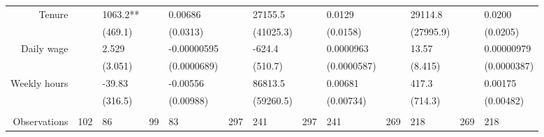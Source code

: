 \begin{tabular}{rrrrrrrrrrrrr}
Tenure & \multicolumn{1}{l}{} & \multicolumn{1}{l}{1063.2**} & \multicolumn{1}{l}{} & \multicolumn{1}{l}{0.00686} & \multicolumn{1}{l}{} & \multicolumn{1}{l}{27155.5} & \multicolumn{1}{l}{} & \multicolumn{1}{l}{0.0129} & \multicolumn{1}{l}{} & \multicolumn{1}{l}{29114.8} & \multicolumn{1}{l}{} & \multicolumn{1}{l}{0.0200} \\
      & \multicolumn{1}{l}{} & \multicolumn{1}{l}{(469.1)} & \multicolumn{1}{l}{} & \multicolumn{1}{l}{(0.0313)} & \multicolumn{1}{l}{} & \multicolumn{1}{l}{(41025.3)} & \multicolumn{1}{l}{} & \multicolumn{1}{l}{(0.0158)} & \multicolumn{1}{l}{} & \multicolumn{1}{l}{(27995.9)} & \multicolumn{1}{l}{} & \multicolumn{1}{l}{(0.0205)} \\
Daily wage & \multicolumn{1}{l}{} & \multicolumn{1}{l}{2.529} & \multicolumn{1}{l}{} & \multicolumn{1}{l}{-0.00000595} & \multicolumn{1}{l}{} & \multicolumn{1}{l}{-624.4} & \multicolumn{1}{l}{} & \multicolumn{1}{l}{0.0000963} & \multicolumn{1}{l}{} & \multicolumn{1}{l}{13.57} & \multicolumn{1}{l}{} & \multicolumn{1}{l}{0.00000979} \\
      & \multicolumn{1}{l}{} & \multicolumn{1}{l}{(3.051)} & \multicolumn{1}{l}{} & \multicolumn{1}{l}{(0.0000689)} & \multicolumn{1}{l}{} & \multicolumn{1}{l}{(510.7)} & \multicolumn{1}{l}{} & \multicolumn{1}{l}{(0.0000587)} & \multicolumn{1}{l}{} & \multicolumn{1}{l}{(8.415)} & \multicolumn{1}{l}{} & \multicolumn{1}{l}{(0.0000387)} \\
Weekly hours & \multicolumn{1}{l}{} & \multicolumn{1}{l}{-39.83} & \multicolumn{1}{l}{} & \multicolumn{1}{l}{-0.00556} & \multicolumn{1}{l}{} & \multicolumn{1}{l}{86813.5} & \multicolumn{1}{l}{} & \multicolumn{1}{l}{0.00681} & \multicolumn{1}{l}{} & \multicolumn{1}{l}{417.3} & \multicolumn{1}{l}{} & \multicolumn{1}{l}{0.00175} \\
      & \multicolumn{1}{l}{} & \multicolumn{1}{l}{(316.5)} & \multicolumn{1}{l}{} & \multicolumn{1}{l}{(0.00988)} & \multicolumn{1}{l}{} & \multicolumn{1}{l}{(59260.5)} & \multicolumn{1}{l}{} & \multicolumn{1}{l}{(0.00734)} & \multicolumn{1}{l}{} & \multicolumn{1}{l}{(714.3)} & \multicolumn{1}{l}{} & \multicolumn{1}{l}{(0.00482)} \\
      & \multicolumn{1}{l}{} & \multicolumn{1}{l}{} & \multicolumn{1}{l}{} & \multicolumn{1}{l}{} & \multicolumn{1}{l}{} & \multicolumn{1}{l}{} & \multicolumn{1}{l}{} & \multicolumn{1}{l}{} & \multicolumn{1}{l}{} & \multicolumn{1}{l}{} & \multicolumn{1}{l}{} & \multicolumn{1}{l}{} \\
      \midrule
Observations & \multicolumn{1}{l}{102} & \multicolumn{1}{l}{86} & \multicolumn{1}{l}{99} & \multicolumn{1}{l}{83} & \multicolumn{1}{l}{297} & \multicolumn{1}{l}{241} & \multicolumn{1}{l}{297} & \multicolumn{1}{l}{241} & \multicolumn{1}{l}{269} & \multicolumn{1}{l}{218} & \multicolumn{1}{l}{269} & \multicolumn{1}{l}{218} \\

\end{tabular}

